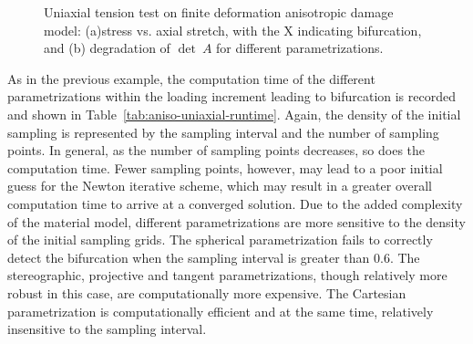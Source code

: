 \documentclass[12pt]{article}
\numberwithin{equation}{section}
\begin{document}
\begin{figure}[!htbp]
  \centering {} 
  \caption{Uniaxial tension test on finite deformation anisotropic
    damage model: (a)stress vs. axial stretch, with the X indicating
    bifurcation, and (b) degradation of $\det~A$ for different
    parametrizations.}
  \label{fig:aniso-stress_stretch}
\end{figure}

As in the previous example, the computation time of the different
parametrizations within the loading increment leading to bifurcation
is recorded and shown in
Table~\ref{tab:aniso-uniaxial-runtime}. Again, the density of the
initial sampling is represented by the sampling interval and the
number of sampling points. In general, as the number of sampling
points decreases, so does the computation time.  Fewer sampling
points, however, may lead to a poor initial guess for the Newton
iterative scheme, which may result in a greater overall computation
time to arrive at a converged solution. Due to the added complexity of
the material model, different parametrizations are more sensitive to
the density of the initial sampling grids. The spherical
parametrization fails to correctly detect the bifurcation when the
sampling interval is greater than 0.6. The stereographic, projective
and tangent parametrizations, though relatively more robust in this
case, are computationally more expensive.  The Cartesian
parametrization is computationally efficient and at the same time,
relatively insensitive to the sampling interval.
\end{document}
